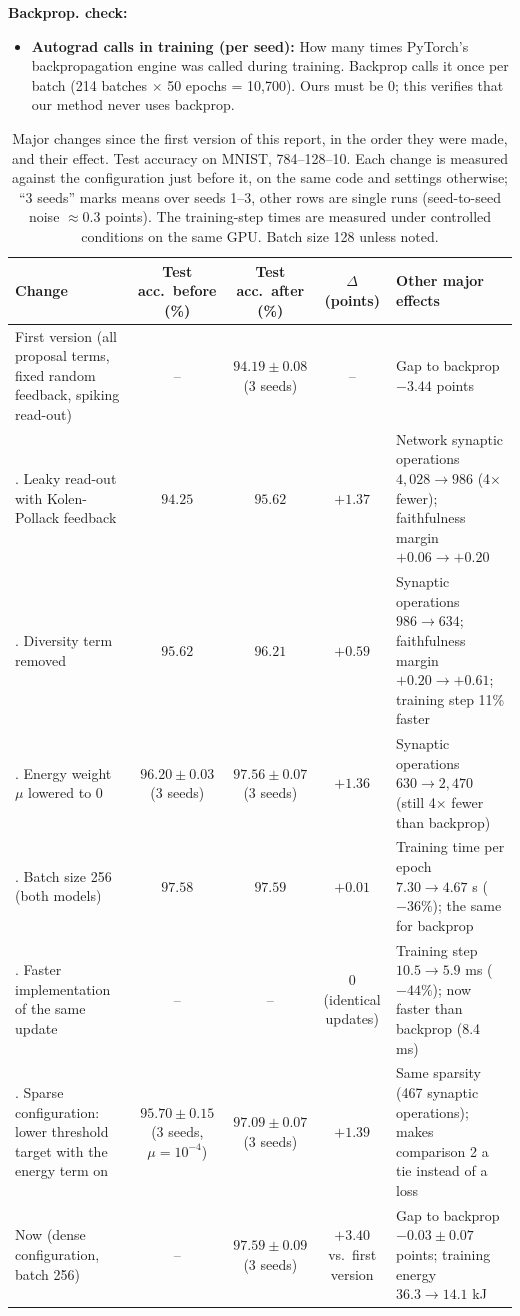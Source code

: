 {\noindent\textbf{Backprop. check:}
\begin{itemize}
  \item \textbf{Autograd calls in training (per seed):} How many times PyTorch's backpropagation engine was called during training. Backprop calls it once per batch (214 batches $\times$ 50 epochs = 10,700). Ours must be 0; this verifies that our method never uses backprop.
\end{itemize}
}

\begin{table}[H]
\centering
\small
\setlength{\tabcolsep}{4pt}
\caption{Major changes since the first version of this report, in the order they were made, and their effect. Test accuracy on MNIST, 784--128--10. Each change is measured against the configuration just before it, on the same code and settings otherwise; ``3 seeds'' marks means over seeds 1--3, other rows are single runs (seed-to-seed noise $\approx 0.3$ points). The training-step times are measured under controlled conditions on the same GPU. Batch size 128 unless noted.}
\label{tab:changes}
\begin{tabular}{>{\raggedright\arraybackslash}p{4.3cm}ccc>{\raggedright\arraybackslash}p{4.4cm}}
\toprule
Change & Test acc.\ before (\%) & Test acc.\ after (\%) & $\Delta$ (points) & Other major effects \\
\midrule
First version (all proposal terms, fixed random feedback, spiking read-out) & -- & $94.19 \pm 0.08$ (3 seeds) & -- & Gap to backprop $-3.44$ points \\
\midrule
1. Leaky read-out with Kolen-Pollack feedback & $94.25$ & $95.62$ & $+1.37$ & Network synaptic operations $4{,}028 \to 986$ (4$\times$ fewer); faithfulness margin $+0.06 \to +0.20$ \\
2. Diversity term removed & $95.62$ & $96.21$ & $+0.59$ & Synaptic operations $986 \to 634$; faithfulness margin $+0.20 \to +0.61$; training step 11\% faster \\
3. Energy weight $\mu$ lowered to 0 & $96.20 \pm 0.03$ (3 seeds) & $97.56 \pm 0.07$ (3 seeds) & $+1.36$ & Synaptic operations $630 \to 2{,}470$ (still 4$\times$ fewer than backprop) \\
4. Batch size 256 (both models) & $97.58$ & $97.59$ & $+0.01$ & Training time per epoch $7.30 \to 4.67$ s ($-36\%$); the same for backprop \\
5. Faster implementation of the same update & -- & -- & $0$ (identical updates) & Training step $10.5 \to 5.9$ ms ($-44\%$); now faster than backprop (8.4 ms) \\
\midrule
6. Sparse configuration: lower threshold target with the energy term on & $95.70 \pm 0.15$ (3 seeds, $\mu = 10^{-4}$) & $97.09 \pm 0.07$ (3 seeds) & $+1.39$ & Same sparsity (467 synaptic operations); makes comparison 2 a tie instead of a loss \\
\midrule
Now (dense configuration, batch 256) & -- & $97.59 \pm 0.09$ (3 seeds) & $+3.40$ vs.\ first version & Gap to backprop $-0.03 \pm 0.07$ points; training energy $36.3 \to 14.1$ kJ \\
\bottomrule
\end{tabular}
\end{table}

